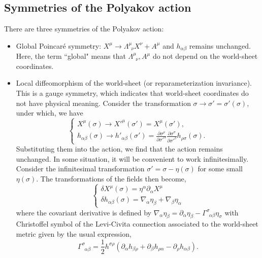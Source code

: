 \documentclass[graybox,envcountchap,sectrefs]{svmono}
\begin{document}
\subsection{Symmetries of the Polyakov action}
There are three symmetries of the Polyakov action:
\begin{itemize}
\item Global Poincar\'{e} symmetry: $X^{\mu}\to \Lambda^{\mu}_{\,\,\,\nu}X^{\nu}+A^{\mu}$ and $h_{\alpha\beta}$ remains unchanged.
Here, the term ``global" means that $\Lambda^{\mu}_{\,\,\,\nu},A^{\mu}$ do not depend on the world-sheet coordinates.
\item Local diffeomorphism of the world-sheet (or reparameterization invariance). This is a gauge symmetry, which indicates that world-sheet coordinates do not have physical meaning. 
Consider the transformation $\sigma \to \sigma'=\sigma'(\sigma)$, under which, we have
\begin{equation}
\begin{cases}
	X^{\mu}(\sigma)\to {X'}^{\mu}(\sigma') =X^{\mu}(\sigma'),\\
	h_{\alpha\beta}(\sigma)\to  {h'}_{\alpha\beta}(\sigma')=
	\frac{\partial \sigma^{\rho}}{\partial {\sigma'}^{\alpha}}
	\frac{\partial \sigma^{\sigma}}{\partial {\sigma'}^{\beta}} 
	h_{\rho\sigma}(\sigma).
\end{cases}	
\end{equation}
Substituting them into the action, we find that the action remains unchanged.
In some situation, it will be convenient to work infinitesimally. Consider the infinitesimal transformation $\sigma'=\sigma-\eta(\sigma)$ for some small $\eta(\sigma)$.
The transformations of the fields then become,
\begin{equation}
\begin{cases}
	\delta X^{\mu}(\sigma)=\eta^{\alpha} \partial_{\alpha} X^{\mu} \\
\delta h_{\alpha \beta}(\sigma)=\nabla_{\alpha} \eta_{\beta}+\nabla_{\beta} \eta_{\alpha}
\end{cases}
\end{equation}
where the covariant derivative is defined by $\nabla_{\alpha} \eta_{\beta}=\partial_{\alpha} \eta_{\beta}-\Gamma_{\,\,\,\alpha \beta}^{\sigma} \eta_{\sigma}$ with Christoffel symbol of the Levi-Civita connection associated to the world-sheet metric given by the usual expression,
\begin{equation}
\Gamma_{\,\,\,\alpha \beta}^{\sigma}=\frac{1}{2} h^{\sigma \rho}\left(\partial_{\alpha} h_{\beta \rho}+\partial_{\beta} h_{\rho \alpha}-\partial_{\rho} h_{\alpha \beta}\right).
\end{equation}





\end{itemize}
\end{document}
